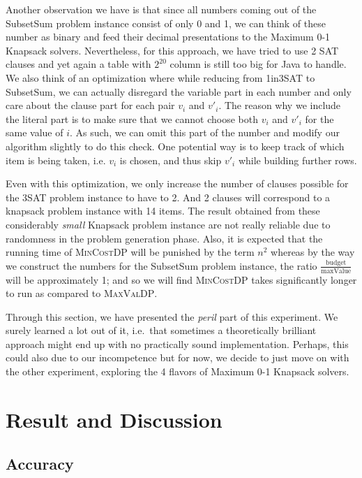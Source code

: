 \documentclass[12pt, oneside]{book}
\begin{document}
Another observation we have is that since all numbers coming out of the
SubsetSum problem instance consist of only 0 and 1, we can think of
these number as binary and feed their decimal presentations to the
Maximum 0-1 Knapsack solvers. Nevertheless, for this approach, we have
tried to use 2 SAT clauses and yet again a table with \(2^{20}\) column
is still too big for Java to handle. We also think of an optimization
where while reducing from 1in3SAT to SubsetSum, we can actually
disregard the variable part in each number and only care about the
clause part for each pair \(v_i\) and \(v'_i\). The reason why we
include the literal part is to make sure that we cannot choose both
\(v_i\) and \(v'_i\) for the same value of \(i\). As such, we can omit
this part of the number and modify our algorithm slightly to do this
check. One potential way is to keep track of which item is being taken,
i.e. \(v_i\) is chosen, and thus skip \(v'_i\) while building further
rows.

Even with this optimization, we only increase the number of clauses
possible for the 3SAT problem instance to have to 2. And 2 clauses will
correspond to a knapsack problem instance with 14 items. The result
obtained from these considerably \emph{small} Knapsack problem instance
are not really reliable due to randomness in the problem generation
phase. Also, it is expected that the running time of \textsc{MinCostDP}
will be punished by the term \(n^2\) whereas by the way we construct the
numbers for the SubsetSum problem instance, the ratio
\(\frac{\text{budget}}{\text{maxValue}}\) will be approximately 1; and
so we will find \textsc{MinCostDP} takes significantly longer to run as
compared to \textsc{MaxValDP}.

Through this section, we have presented the \emph{peril} part of this
experiment. We surely learned a lot out of it, i.e.~that sometimes a
theoretically brilliant approach might end up with no practically sound
implementation. Perhaps, this could also due to our incompetence but for
now, we decide to just move on with the other experiment, exploring the
4 flavors of Maximum 0-1 Knapsack solvers.

\chapter{Result and Discussion}\label{result}

\section{Accuracy}\label{accuracy}
\end{document}
